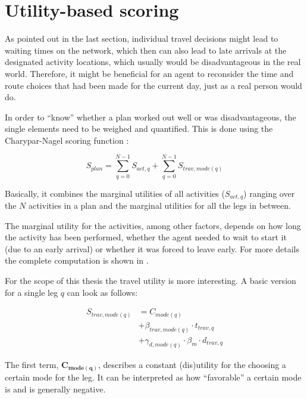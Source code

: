 \section{Utility-based scoring}

As pointed out in the last section, individual travel decisions might lead to
waiting times on the network, which then can also lead to late arrivals at the
designated activity locations, which usually would be disadvantageous in the real
world. Therefore, it might be beneficial for an agent to reconsider the time and
route choices that had been made for the current day, just as a real person
would do.

In order to ``know'' whether a plan worked out well or was disadvantageous, the
single elements need to be weighed and quantified. This is done using the Charypar-Nagel
scoring function \cite{Horni2015}:

\begin{equation}
S_{plan} = \sum_{q=0}^{N-1} S_{act,q} + \sum_{q=0}^{N-1} S_{trav,mode(q)}
\end{equation}

Basically, it combines the marginal utilities of all activities ($S_{act,q}$) ranging
over the $N$ activities in a plan and the marginal utilities for all the legs in
between.

The marginal utility for the activities, among other factors, depends on how long
the activity has been performed, whether the agent needed to wait to start it (due
to an early arrival) or whether it was forced to leave early. For more details
the complete computation is shown in \cite{Horni2015}.

For the scope of this thesis the travel utility is more interesting. A basic version
for a single leg $q$ can look as follows:

\begin{equation}\begin{aligned}
S_{trav,mode(q)} &= C_{mode(q)} \\ &+ \beta_{trav,mode(q)} \cdot t_{trav,q} \\
&+ \gamma_{d,mode(q)} \cdot \beta_{m} \cdot d_{trav,q}
\end{aligned}\end{equation}

The first term, $\mathbf{C_{mode(q)}}$, describes a constant (dis)utility for the
choosing a certain mode for the leg. It can be interpreted as how ``favorable''
a certain mode is and is generally negative.\\

